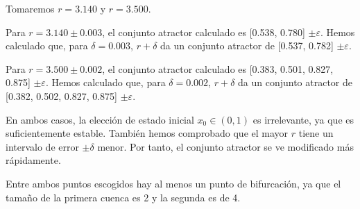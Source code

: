 \documentclass[a4paper]{article}
\begin{document}
	Tomaremos $r=3.140$ y $r=3.500$.
	
	Para $r=3.140\pm 0.003$, el conjunto atractor calculado es [0.538, 0.780] $\pm \varepsilon$.
	Hemos calculado que, para $\delta=0.003$, $r+\delta$ da un conjunto atractor de [0.537, 0.782] $\pm \varepsilon$.
	
	Para $r=3.500\pm 0.002$, el conjunto atractor calculado es [0.383, 0.501, 0.827, 0.875] $\pm \varepsilon$.
	Hemos calculado que, para $\delta=0.002$, $r+\delta$ da un conjunto atractor de [0.382, 0.502, 0.827, 0.875] $\pm \varepsilon$.
	
	En ambos casos, la elección de estado inicial $x_0\in(0,1)$ es irrelevante, ya que es suficientemente estable. También hemos comprobado que el mayor $r$ tiene un intervalo de error $\pm\delta$ menor. Por tanto, el conjunto atractor se ve modificado más rápidamente. 
	
	Entre ambos puntos escogidos hay al menos un punto de bifurcación, ya que el tamaño de la primera cuenca es 2 y la segunda es de 4.
	
\end{document}
